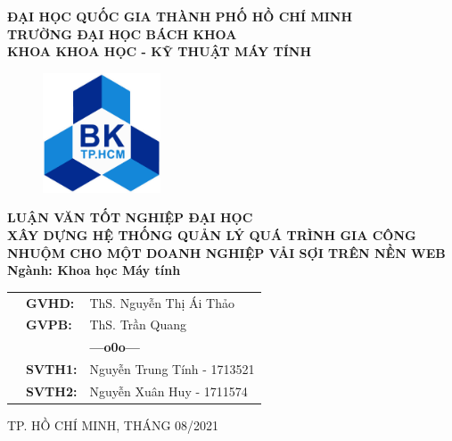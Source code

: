 \documentclass[a4paper,12pt,fleqn,print,oneside]{extarticle}
\begin{document}
\begin{titlepage}
\afterpage{\aftergroup\restoregeometry}
\begin{center}
\textbf{{\Large ĐẠI HỌC QUỐC GIA THÀNH PHỐ HỒ CHÍ MINH \\
TRƯỜNG ĐẠI HỌC BÁCH KHOA \\
KHOA KHOA HỌC - KỸ THUẬT MÁY TÍNH}}
\end{center}

\vspace{0.5cm}

\begin{figure}[h!]
\begin{center}
\includegraphics[width=3.5cm]{Image/hcmut.png}
\end{center}
\end{figure}

\vspace{0.5cm}


\begin{center}
\textbf{{\Large LUẬN VĂN TỐT NGHIỆP ĐẠI HỌC}}\\
\vspace{1cm}
\textbf{{\Large XÂY DỰNG HỆ THỐNG QUẢN LÝ QUÁ TRÌNH GIA CÔNG NHUỘM CHO MỘT DOANH NGHIỆP VẢI SỢI TRÊN NỀN WEB}}\\
\vspace{1cm}
\textbf{{\Large Ngành: Khoa học Máy tính}}
\end{center}

\vspace{2cm}

\begin{table}[h]
\renewcommand{\arraystretch}{1.5}
\begin{tabular}{lll}
\hspace{5 cm}
& \textbf{{\large GVHD:}} & {\large ThS. Nguyễn Thị Ái Thảo} \\
& \textbf{{\large GVPB:}} & {\large ThS. Trần Quang}\\
&  & \textbf{---o0o---} \\
& \textbf{{\large SVTH1:}} & {\large Nguyễn Trung Tính - 1713521} \\
& \textbf{{\large SVTH2:}} & {\large Nguyễn Xuân Huy - 1711574} \\
\end{tabular}
\end{table}

\begin{center}
{\footnotesize {\large TP. HỒ CHÍ MINH, THÁNG 08/2021}}
\end{center}
\end{titlepage}
\end{document}
